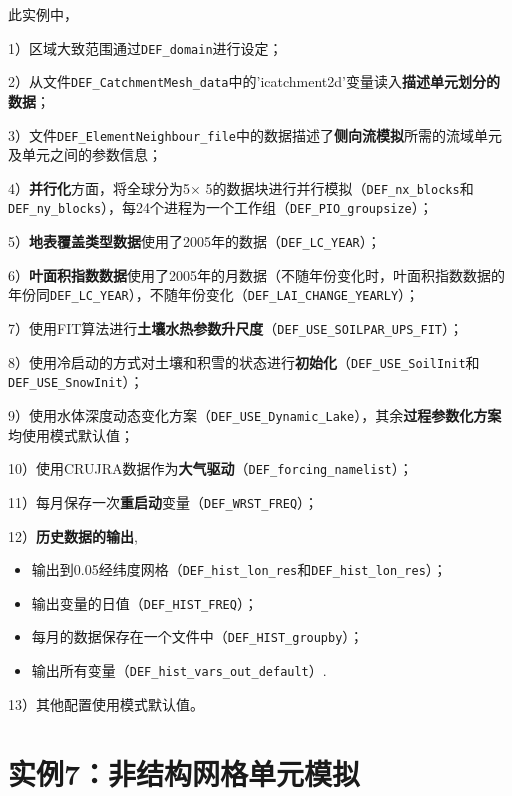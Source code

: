 此实例中，\par
1）区域大致范围通过\texttt{DEF\_domain}进行设定；\par
2）从文件\texttt{DEF\_CatchmentMesh\_data}中的'icatchment2d'变量读入\textbf{描述单元划分的数据}；\par
3）文件\texttt{DEF\_ElementNeighbour\_file}中的数据描述了\textbf{侧向流模拟}所需的流域单元及单元之间的参数信息；\par
4）\textbf{并行化}方面，将全球分为5\textdegree$\times$ 5\textdegree 的数据块进行并行模拟（\texttt{DEF\_nx\_blocks}和\texttt{DEF\_ny\_blocks}），每24个进程为一个工作组（\texttt{DEF\_PIO\_groupsize}）；\par
5）\textbf{地表覆盖类型数据}使用了2005年的数据（\texttt{DEF\_LC\_YEAR}）；\par
6）\textbf{叶面积指数数据}使用了2005年的月数据（不随年份变化时，叶面积指数数据的年份同\texttt{DEF\_LC\_YEAR}），不随年份变化（\texttt{DEF\_LAI\_CHANGE\_YEARLY}）；\par
7）使用FIT算法进行\textbf{土壤水热参数升尺度}（\texttt{DEF\_USE\_SOILPAR\_UPS\_FIT}）；\par
8）使用冷启动的方式对土壤和积雪的状态进行\textbf{初始化}（\texttt{DEF\_USE\_SoilInit}和\texttt{DEF\_\allowbreak USE\allowbreak\_SnowInit}）；\par
9）使用水体深度动态变化方案（\texttt{DEF\_USE\_Dynamic\_Lake}），其余\textbf{过程参数化方案}均使用模式默认值；\par
10）使用CRUJRA数据作为\textbf{大气驱动}（\texttt{DEF\_forcing\_namelist}）；\par
11）每月保存一次\textbf{重启动}变量（\texttt{DEF\_WRST\_FREQ}）；\par
12）\textbf{历史数据的输出},
\begin{itemize}[nosep,leftmargin=4em]
    \item 输出到0.05\textdegree 经纬度网格（\texttt{DEF\_hist\_lon\_res}和\texttt{DEF\_hist\_lon\_res}）；
    \item 输出变量的日值（\texttt{DEF\_HIST\_FREQ}）；
    \item 每月的数据保存在一个文件中（\texttt{DEF\_HIST\_groupby}）；
    \item 输出所有变量（\texttt{DEF\_hist\_vars\_out\_default}）.
\end{itemize}\par
13）其他配置使用模式默认值。


\section{实例7：非结构网格单元模拟}

